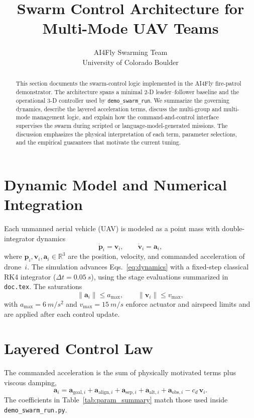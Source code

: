 \documentclass[conference]{AIAA}
\title{Swarm Control Architecture for Multi-Mode UAV Teams}
\author{AI4Fly Swarming Team\\University of Colorado Boulder}
\begin{document}
\maketitle

\begin{abstract}
This section documents the swarm-control logic implemented in the AI4Fly fire-patrol demonstrator.  The architecture spans a minimal 2-D leader--follower baseline and the operational 3-D controller used by \texttt{demo\_swarm\_run}.  We summarize the governing dynamics, describe the layered acceleration terms, discuss the multi-group and multi-mode management logic, and explain how the command-and-control interface supervises the swarm during scripted or language-model-generated missions.  The discussion emphasizes the physical interpretation of each term, parameter selections, and the empirical guarantees that motivate the current tuning.
\end{abstract}

\section{Dynamic Model and Numerical Integration}
Each unmanned aerial vehicle (UAV) is modeled as a point mass with double-integrator dynamics
\begin{equation}
	\dot{\mathbf{p}}_i = \mathbf{v}_i, \qquad
	\dot{\mathbf{v}}_i = \mathbf{a}_i,
	\label{eq:dynamics}
\end{equation}
where \(\mathbf{p}_i,\mathbf{v}_i,\mathbf{a}_i \in \mathbb{R}^3\) are the position, velocity, and commanded acceleration of drone~$i$.  The simulation advances Eqs.~\eqref{eq:dynamics} with a fixed-step classical RK4 integrator (\(\Delta t = \SI{0.05}{s}\)), using the stage evaluations summarized in \texttt{doc.tex}.  The saturations
\begin{equation}
	\lVert \mathbf{a}_i \rVert \leq a_{\max}, \qquad
	\lVert \mathbf{v}_i \rVert \leq v_{\max},
\end{equation}
with \(a_{\max}=\SI{6}{m/s^2}\) and \(v_{\max}=\SI{15}{m/s}\) enforce actuator and airspeed limits and are applied after each control update.

\section{Layered Control Law}
The commanded acceleration is the sum of physically motivated terms plus viscous damping,
\begin{equation}
	\mathbf{a}_i = \mathbf{a}_{\text{goal},i} + \mathbf{a}_{\text{align},i} + \mathbf{a}_{\text{sep},i} + \mathbf{a}_{\text{alt},i} + \mathbf{a}_{\text{obs},i} - c_d\,\mathbf{v}_i.
	\label{eq:control}
\end{equation}
The coefficients in Table~\ref{tab:param_summary} match those used inside \texttt{demo\_swarm\_run.py}.
\end{document}
